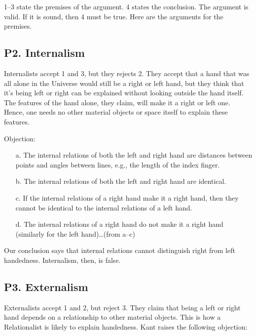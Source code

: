 \documentclass[oneside]{article}
\begin{document}
1--3 state the premises of the argument. 4 states the conclusion. The
argument is valid. If it is sound, then 4 must be true. Here are the
arguments for the premises.

\subsection*{P2. Internalism}\label{p2.-internalism}

Internalists accept 1 and 3, but they rejects 2. They accept that a hand
that was all alone in the Universe would still be a right or left hand,
but they think that it's being left or right can be explained without
looking outside the hand itself. The features of the hand alone, they
claim, will make it a right or left one. Hence, one needs no other
material objects or space itself to explain these features.

Objection:

\begin{enumerate}

\item[a.]
  The internal relations of both the left and right hand are distances
  between points and angles between lines, e.g., the length of the index
  finger.
\item[b.]
  The internal relations of both the left and right hand are identical.
\item[c.]
  If the internal relations of a right hand make it a right hand, then
  they cannot be identical to the internal relations of a left hand.
\item[d.]
  The internal relations of a right hand do not make it a right hand
  (similarly for the left hand)\ldots{}(from a--c)
\end{enumerate}

Our conclusion says that internal relations cannot distinguish right
from left handedness. Internalism, then, is false. 

\subsection*{P3. Externalism}\label{p3.-externalism}

Externalists accept 1 and 2, but reject 3. They claim that being a left
or right hand depends on a relationship to other material objects. This is how a Relationalist is likely to explain handedness. Kant raises the following objection:
\end{document}
